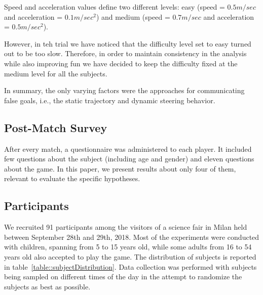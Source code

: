 Speed and acceleration values define two different levels: easy (speed = $0.5m/sec$ and acceleration = $0.1m/sec^2$) and medium (speed = $0.7m/sec$ and acceleration = $0.5m/sec^2$).

However, in teh trial we have noticed that the difficulty level set to easy turned out to be too slow. Therefore, in order to maintain consistency in the analysis while also improving fun we have decided to keep the difficulty fixed at the medium level for all the subjects.

In summary, the only varying factors were the approaches for communicating false goals, i.e., the static trajectory and dynamic steering behavior.

\subsection{Post-Match Survey}

After every match, a questionnaire was administered to each player. It included few questions about the subject (including age and gender) and eleven questions about the game. In this paper, we present results about only four of them, relevant to evaluate the specific hypotheses.

\subsection{Participants}
We recruited 91 participants among the visitors of a science fair in Milan held between September 28th and 29th, 2018. Most of the experiments were conducted with children, spanning from 5 to 15 years old, while some adults from 16 to 54 years old also accepted to play the game. The distribution of subjects is reported in table~\ref{table::subjectDistribution}. Data collection was performed with subjects being sampled on different times of the day in the attempt to randomize the subjects as best as possible. 

